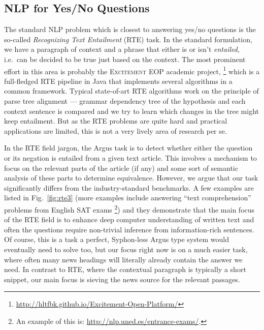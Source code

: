 \documentclass[11pt,a4paper]{article}
\begin{document}
\subsection{NLP for Yes/No Questions}

The standard NLP problem which is closest to answering yes/no questions
is the so-called \textit{Recognizing Text Entailment} (RTE) task.
In the standard formulation,
we have a paragraph of context and a phrase that either is or isn't
\textit{entailed}, i.e.\ can be decided to be true just based on the context.
The most prominent effort in this area is probably the
\textsc{Excitement EOP} academic project,%
\footnote{\url{http://hltfbk.github.io/Excitement-Open-Platform/}}
which is a full-fledged
RTE pipeline in Java that implements several algorithms
in a common framework.
Typical state-of-art RTE algorithms work on the principle of parse tree
alignment --- grammar dependency tree of the hypothesis and each context
sentence is compared and we try to learn which changes in the tree might
keep entailment.
But as the RTE problems are quite hard and practical applications are limited,
this is not a very lively area of research per se.

In the RTE field jargon, the Argus task is to detect whether either the question or
its negation is entailed from a given text article.  This involves
a mechanism to focus on the relevant parts of the article (if any)
and some sort of semantic analysis of these parts to determine
equivalence.
However, we argue that our task significantly differs from
the industry-standard benchmarks.  A few examples are listed in Fig.~\ref{fig:rte3}
(more examples include answering ``text comprehension'' problems from
English SAT exams%
\footnote{An example of this is: \url{http://nlp.uned.es/entrance-exams/}.})
and they demonstrate that the main focus of the RTE field is to enhance
deep computer understanding of written text and often the questions
require non-trivial inference from information-rich sentences.
Of course, this is a task a perfect, Syphon-less Argus type system
would eventually need to solve too, but our focus right now is on a much
easier task, where often many news headings will literally already contain
the answer we need.  In contrast to RTE, where the contextual paragraph is
typically a short snippet, our main focus is sieving the news source for
the relevant passages.
\end{document}
